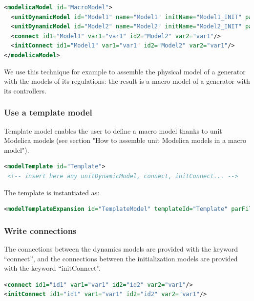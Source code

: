 \documentclass[a4paper, 12pt]{report}
\begin{document}
\begin{lstlisting}[language=XML, morekeywords={unitDynamicModel, connect, initConnect}]
<modelicaModel id="MacroModel">
  <unitDynamicModel id="Model1" name="Model1" initName="Model1_INIT" parFile="MyPar.par" parId="2"/>
  <unitDynamicModel id="Model2" name="Model2" initName="Model2_INIT" parFile="MyPar.par" parId="3"/>
  <connect id1="Model1" var1="var1" id2="Model2" var2="var1"/>
  <initConnect id1="Model1" var1="var1" id2="Model2" var2="var1"/>
</modelicaModel>
\end{lstlisting}

We use this technique for example to assemble the physical model of a generator with the models of its regulations: the result is a macro model of a generator with its controllers.

\subsubsection{Use a template model}

Template model enables the user to define a macro model thanks to unit Modelica models (see section "How to assemble unit Modelica models in a macro model").

\begin{lstlisting}[language=XML]
<modelTemplate id="Template">
 <!-- insert here any unitDynamicModel, connect, initConnect... -->
\end{lstlisting}

The template is instantiated as:
\begin{lstlisting}[language=XML,numbers=none]
<modelTemplateExpansion id="TemplateModel" templateId="Template" parFile="MyPar.par" parId="6">
\end{lstlisting}

\subsubsection{Write connections}

The connections between the dynamics models are provided with the keyword ``connect'', and the connections between the initialization models are provided with the keyword ``initConnect''.
\begin{lstlisting}[language=XML]
<connect id1="id1" var1="var1" id2="id2" var2="var1"/>
<initConnect id1="id1" var1="var1" id2="id2" var2="var1"/>
\end{lstlisting}
\end{document}
